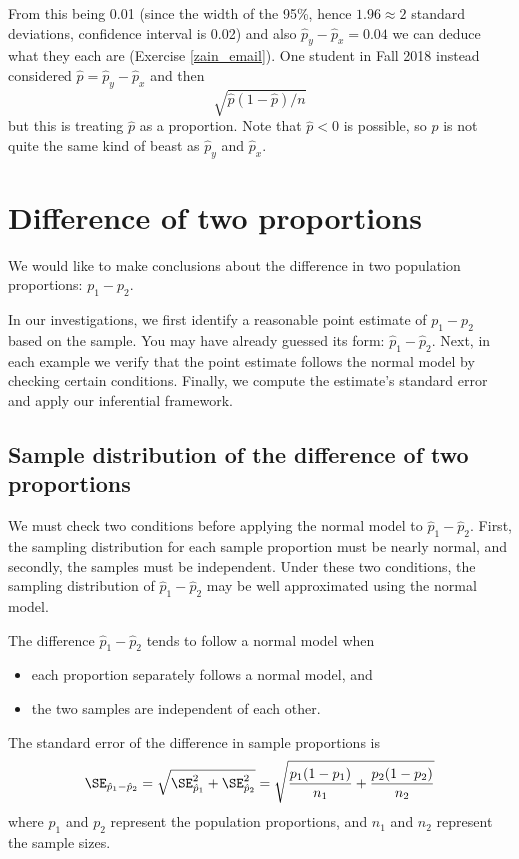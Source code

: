 From this being 0.01 (since the width of the 95\%, hence $1.96\approx 2$ standard deviations, confidence interval is 0.02) and also $\hat p_y-\hat p_x=0.04$ we can deduce what they each are (Exercise \ref{zain_email}). One student in Fall 2018 instead considered $\hat p = \hat p_y-\hat p_x$ and then
$$\sqrt{\hat p(1-\hat p)/n}$$but this is treating $\hat p$ as a proportion. Note that $\hat p<0$ is possible, so $\hat p$ is not quite the same kind of beast as $\hat p_y$ and $\hat p_x$. 




\section{Difference of two proportions}
\label{differenceOfTwoProportions}

We would like to make conclusions about the difference in two population proportions: \mbox{$p_1 - p_2$}.

In our investigations, we first identify a reasonable point estimate of $p_1 - p_2$ based on the sample. You may have already guessed its form: $\hat{p}_1 - \hat{p}_2$. Next, in each example we verify that the point estimate follows the normal model by checking certain conditions. Finally, we compute the estimate's standard error and apply our inferential framework.


\subsection{Sample distribution of the difference of two proportions}

We must check two conditions before applying the normal model to $\hat{p}_1 - \hat{p}_2$. First, the sampling distribution for each sample proportion must be nearly normal, and secondly, the samples must be independent. Under these two conditions, the sampling distribution of $\hat{p}_1 - \hat{p}_2$ may be well approximated using the normal model.

\begin{termBox}{
The difference $\hat{p}_1 - \hat{p}_2$ tends to follow a normal model when
\begin{itemize}
\setlength{\itemsep}{0mm}
\item each proportion separately follows a normal model, and
\item the two samples are independent of each other.
\end{itemize}
The standard error of the difference in sample proportions is
\begin{eqnarray}
\SE_{\hat{p}_1 - \hat{p}_2}
	= \sqrt{\SE_{\hat{p}_1}^2 + \SE_{\hat{p}_2}^2}
	= \sqrt{\frac{p_1(1-p_1)}{n_1} + \frac{p_2(1-p_2)}{n_2}}
\label{seForDiffOfProp}
\end{eqnarray}
where $p_1$ and $p_2$ represent the population proportions, and $n_1$ and $n_2$ represent the sample sizes.}
\end{termBox}


